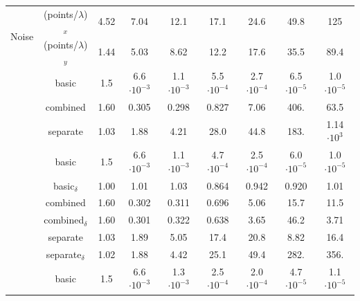 \begin{table}[H]
\centering
    \begin{tabular}{|c|c|ccccccc|}
        \hline
        \multirow{2}{*}{Noise} & (points/$\lambda$)$_x$ & 4.52 & 7.04 & 12.1 & 17.1 & 24.6 & 49.8 & 125 \\
        & (points/$\lambda$)$_y$ & 1.44 & 5.03 & 8.62 & 12.2 & 17.6 & 35.5 & 89.4 \\
        \hline
        \hline
        \rowcolor[gray]{.9}
        \cellcolor{white}
        & basic & 1.5 & 6.6$\cdot 10^{-3}$ & 1.1$\cdot 10^{-3}$ & 5.5$\cdot 10^{-4}$ & 2.7$\cdot 10^{-4}$ & 6.5$\cdot 10^{-5}$ & 1.0$\cdot 10^{-5 }$ \\
        \cline{2-9}
        \cellcolor{white}
        & combined & 1.60 & 0.305 & 0.298 & 0.827 & 7.06 & 406. & 63.5 \\
        \cellcolor{white}
        \multirow{-3}{*}{0\%}& separate & 1.03 & 1.88 & 4.21 & 28.0 & 44.8 & 183. & 1.14$\cdot 10^{3}$ \\
        \hline
        \hline
        \rowcolor[gray]{.9}
        \cellcolor{white}
        & basic & 1.5 & 6.6$\cdot 10^{-3}$ & 1.1$\cdot 10^{-3}$ & 4.7$\cdot 10^{-4}$ & 2.5$\cdot 10^{-4}$ & 6.0$\cdot10^{-5}$ & 1.0$\cdot 10^{-5 }$ \\
        \cline{2-9}
        \cellcolor{white}
        & basic$_\delta$ & 1.00 & 1.01 & 1.03 & 0.864 & 0.942 & 0.920 & 1.01 \\
        \cellcolor{white}
        & combined & 1.60 & 0.302 & 0.311 & 0.696 & 5.06 & 15.7 & 11.5 \\
        \cellcolor{white}
        & combined$_\delta$ & 1.60 & 0.301 & 0.322 & 0.638 & 3.65 & 46.2 & 3.71 \\
        \cellcolor{white}
        & separate & 1.03 & 1.89 & 5.05 & 17.4 & 20.8 & 8.82 & 16.4 \\
        \cellcolor{white}
        \multirow{-6}{*}{0.05\%}
        & separate$_\delta$ & 1.02 & 1.88 & 4.42 & 25.1 & 49.4 & 282. & 356. \\
        \hline
        \hline
        \rowcolor[gray]{.9}
        \cellcolor{white}
        & basic & 1.5 & 6.6$\cdot 10^{-3}$ & 1.3$\cdot 10^{-3}$ & 2.5$\cdot 10^{-4}$ & 2.0$\cdot 10^{-4}$ & 4.7$\cdot 10^{-5}$ & 1.1$\cdot 10^{-5 }$ \\

\end{tabular}
\end{table}
